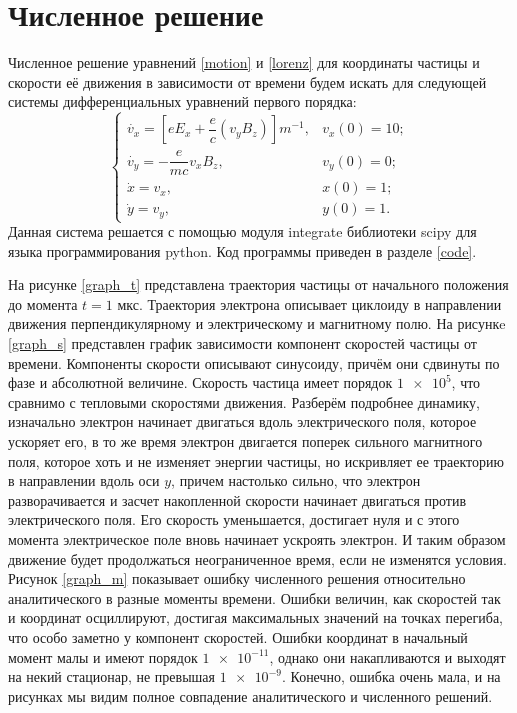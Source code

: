 \documentclass[a4paper]{article}
\begin{document}
\section{Численное решение}\label{Numerical}
Численное решение уравнений \eqref{motion} и \eqref{lorenz} для координаты частицы и скорости её движения в зависимости от времени будем искать для следующей системы дифференциальных уравнений первого порядка:
\begin{equation}
	\begin{cases}
		\dot{v_x} = \left[eE_x + \dfrac{e}{c}\left(v_yB_z\right)\right]m^{-1},	
											& 	v_x(0) = 10	;	\\[10pt] 
		\dot{v_y} = -\dfrac{e}{mc} v_x B_z,	&	v_y(0) = 0 ;	\\[10pt]
		\dot{x} = v_x ,						&	x(0) = 1 ;	\\[10pt]
		\dot{y} = v_y ,						&	y(0) = 1 . 
	\end{cases}
\end{equation}
Данная система решается с помощью модуля integrate \cite{web:scipy.integrate} библиотеки scipy  для языка программирования python. Код программы приведен в разделе \ref{code}. 

На рисунке \ref{graph_t} представлена траектория частицы от начального положения до момента $t = 1$ мкс. Траектория электрона описывает циклоиду в направлении движения перпендикулярному и электрическому и магнитному полю. На рисункe \ref{graph_s} представлен график зависимости компонент скоростей частицы от времени. Компоненты скорости описывают синусоиду, причём они сдвинуты по фазе и абсолютной величине. Скорость частица имеет порядок $\num{1e5}$, что сравнимо с тепловыми скоростями движения. Разберём подробнее динамику, изначально электрон начинает двигаться вдоль электрического поля, которое ускоряет его, в то же время электрон двигается поперек сильного магнитного поля, которое хоть и не изменяет энергии частицы, но искривляет ее траекторию в направлении вдоль оси $y$, причем настолько сильно, что электрон разворачивается и засчет накопленной скорости начинает двигаться против электрического поля. Его скорость уменьшается, достигает нуля и с этого момента электрическое поле вновь начинает ускроять электрон. И таким образом движение будет продолжаться неограниченное время, если не изменятся условия. Рисунок \ref{graph_m} показывает ошибку численного решения относительно аналитического в разные моменты времени. Ошибки величин, как скоростей так и координат осциллируют, достигая максимальных значений на точках перегиба, что особо заметно у компонент скоростей. Ошибки координат в начальный момент малы и имеют порядок $\num{1e-11}$, однако они накапливаются и выходят на некий стационар, не превышая $\num{1e-9}$. Конечно, ошибка очень мала, и на рисунках мы видим полное совпадение аналитического и численного решений.
\end{document}
